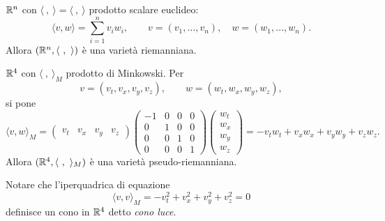 \documentclass[a4paper]{article}
\begin{document}
\begin{snippetexercise}{}
    \(\mathbb{R}^n\) con \(\langle\ ,\ \rangle=\langle\ ,\ \rangle\) prodotto scalare euclideo:
    \[
    \langle v,w\rangle=\sum_{i=1}^n v_iw_i,
    \qquad
    v=(v_1,\ldots,v_n),\quad w=(w_1,\ldots,w_n).
    \]
    Allora \((\realnumbers^n,\langle\ ,\ \rangle)\) è una varietà riemanniana.
\end{snippetexercise}

\begin{snippetexercise}{}
    \(\mathbb{R}^4\) con \(\langle\ ,\ \rangle_M\) prodotto di Minkowski. Per
    \[
    v=(v_t,v_x,v_y,v_z),
    \qquad
    w=(w_t,w_x,w_y,w_z),
    \]
    si pone
    \[
    \langle v,w\rangle_M
    =
    \begin{pmatrix}v_t&v_x&v_y&v_z\end{pmatrix}
    \begin{pmatrix}
    -1&0&0&0\\
    0&1&0&0\\
    0&0&1&0\\
    0&0&0&1
    \end{pmatrix}
    \begin{pmatrix}w_t\\w_x\\w_y\\w_z\end{pmatrix}
    =-v_tw_t+v_xw_x+v_yw_y+v_zw_z.
    \]
    Allora \((\realnumbers^4,\langle\ ,\ \rangle_M)\) è una varietà pseudo-riemanniana.
\end{snippetexercise}

Notare che l'iperquadrica di equazione
\[
\langle v,v\rangle_M=-v_t^2+v_x^2+v_y^2+v_z^2=0
\]
definisce un cono in \(\mathbb{R}^4\) detto \textit{cono luce}.

\begin{center}
\end{center}
\end{document}
